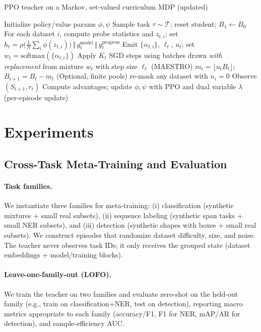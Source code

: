 \documentclass[11pt]{article}
\newcommand{\1}{\mathbf{1}}
\newcommand{\MAESTRO}{\textsc{MAESTRO}\xspace}
\begin{document}
\begin{algorithm}[H]
\caption{PPO teacher on a Markov, set-valued curriculum MDP (updated)}
\label{alg:ppo}
\begin{algorithmic}[1]
\State Initialize policy/value params $\phi,\psi$
    \State Sample task $\tau\sim\mathcal{T}$; reset student; $B_1\leftarrow B_0$
      \State {}
      \State For each dataset $i$, compute probe statistics and $z_{t,i}$; set $h_t=\rho\!\big(\tfrac{1}{N}\sum_i \phi(z_{t,i})\big)\,\Vert\,g^{\text{model}}_t\,\Vert\,g^{\text{progress}}_t$
      \State Emit $\{\alpha_{t,i}\}$, $\ell_t$, $u_t$; set $w_t=\mathrm{softmax}(\{\alpha_{t,i}\})$
      \State Apply $K_t$ SGD steps using batches drawn \emph{with replacement} from mixture $w_t$ with step size $\ell_t$ (\MAESTRO{})
      \State $m_t=\lfloor u_t B_t\rfloor$;\quad $B_{t+1}=B_t-m_t$
      \State (Optional, finite pools) re-mask any dataset with $n_i=0$
      \State Observe $(S_{t+1}, r_t)$
    \EndFor
  \EndFor
  \State Compute advantages; update $\phi,\psi$ with PPO and dual variable $\lambda$ (per-episode update)
\EndFor
\end{algorithmic}
\end{algorithm}

\section{Experiments}
\subsection{Cross-Task Meta-Training and Evaluation}
\paragraph{Task families.}
We instantiate three families for meta-training: (i) classification (synthetic mixtures + small real subsets), (ii) sequence labeling (synthetic span tasks + small NER subsets), and (iii) detection (synthetic shapes with boxes + small real subsets). 
We construct episodes that randomize dataset difficulty, size, and noise. 
The teacher never observes task IDs; it only receives the grouped state (dataset embeddings + model/training blocks).

\paragraph{Leave-one-family-out (LOFO).}
We train the teacher on two families and evaluate zero-shot on the held-out family (e.g., train on classification+NER, test on detection), reporting macro metrics appropriate to each family (accuracy/F1, F1 for NER, mAP/AR for detection), and sample-efficiency AUC.
\end{document}
